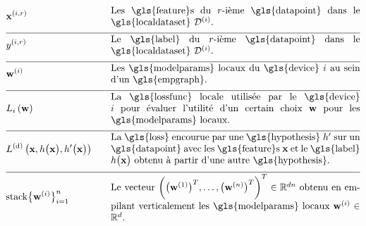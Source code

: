 \begin{align}
	&\featurevec^{(\nodeidx,\sampleidx)} & \quad & \parbox{.75\textwidth}{Les \gls{feature}s du $\sampleidx$-ième \gls{datapoint} dans le \gls{localdataset} $\localdataset{\nodeidx}$.} \nonumber \\[2mm] \hline \nonumber\\[-5mm]
	&\truelabel^{(\nodeidx,\sampleidx)} & \quad & \parbox{.75\textwidth}{Le \gls{label} du $\sampleidx$-ième \gls{datapoint} dans le \gls{localdataset} $\localdataset{\nodeidx}$.} \nonumber \\[2mm] \hline \nonumber\\[-5mm]
	&\localparams{\nodeidx} & \quad & \parbox{.75\textwidth}{Les \gls{modelparams} locaux du \gls{device} $\nodeidx$ au sein d’un \gls{empgraph}.} \nonumber \\[2mm] \hline \nonumber\\[-5mm]
	&\locallossfunc{\nodeidx}{\weights} & \quad & \parbox{.75\textwidth}{La \gls{lossfunc} locale utilisée par le \gls{device} $\nodeidx$ pour évaluer l’utilité d’un certain choix $\weights$ pour les \gls{modelparams} locaux.} \nonumber \\[2mm] \hline \nonumber\\[-5mm]
	&\gtvloss{\featurevec}{\hypothesis\big(\featurevec\big)}{\hypothesis'\big(\featurevec\big)} & \quad & \parbox{.75\textwidth}{La \gls{loss} encourue par une \gls{hypothesis} $\hypothesis'$ sur un \gls{datapoint} avec les \gls{feature}s $\featurevec$ et le \gls{label} $\hypothesis\big( \featurevec\big)$ obtenu à partir d’une autre \gls{hypothesis}.} \nonumber \\[2mm] \hline \nonumber\\[-5mm]
	&{\rm stack} \big\{ \weights^{(\nodeidx)} \big\}_{\nodeidx=1}^{\nrnodes} & \quad & \parbox{.75\textwidth}{Le vecteur $\bigg( \big(\weights^{(1)}  \big)^{T}, \ldots, \big(\weights^{(\nrnodes)}  \big)^{T} \bigg)^{T} \in \mathbb{R}^{\dimlocalmodel\nrnodes}$ obtenu en empilant verticalement les \gls{modelparams} locaux $\weights^{(\nodeidx)} \in \mathbb{R}^{\dimlocalmodel}$.} \nonumber
\end{align}
        


